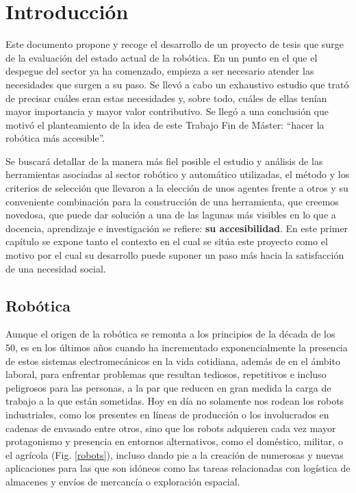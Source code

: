 \chapter{Introducción}

Este documento propone y recoge el desarrollo de un proyecto de tesis que surge de la evaluación del estado actual de la robótica. En un punto en el que el despegue del sector ya ha comenzado, empieza a ser necesario atender las necesidades que surgen a su paso. Se llevó a cabo un exhaustivo estudio que trató de precisar cuáles eran estas necesidades y, sobre todo, cuáles de  ellas tenían mayor importancia y mayor valor contributivo. Se llegó a una conclusión que motivó el planteamiento de la idea de este Trabajo Fin de Máster: ``hacer la robótica más accesible''.

Se buscará detallar de la manera más fiel posible el estudio y análisis de las herramientas asociadas al sector robótico y automático utilizadas, el método y los criterios de selección que llevaron a la elección de unos agentes frente a otros y su conveniente combinación para la construcción de una herramienta, que creemos novedosa, que puede dar solución a una de las lagunas más visibles en lo que a docencia, aprendizaje e investigación se refiere: {\bf{su accesibilidad}}. En este primer capítulo se expone tanto el contexto en el cual se sitúa este proyecto como el motivo por el cual su desarrollo puede suponer un paso más hacia la satisfacción de una necesidad social.

\section{Robótica}

Aunque el origen de la robótica se remonta a los principios de la década de los 50, es en los últimos años cuando ha incrementado exponencialmente la presencia de estos sistemas electromecánicos en la vida cotidiana, además de en el ámbito laboral, para enfrentar problemas que resultan tediosos, repetitivos e incluso peligrosos para las personas, a la par que reducen en gran medida la carga de trabajo a la que están sometidas. Hoy en día no solamente nos rodean los robots industriales, como los presentes en líneas de producción o los involucrados en cadenas de envasado entre otros, sino que los robots adquieren cada vez mayor protagonismo y presencia en entornos alternativos, como el doméstico, militar, o el agrícola (Fig. \ref{robots}), incluso dando pie a la creación de numerosas y nuevas aplicaciones para las que son idóneos como las tareas relacionadas con logística de almacenes y envíos de mercancía o exploración espacial.


